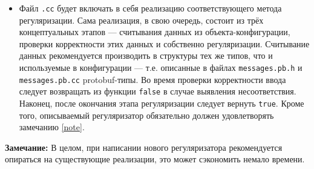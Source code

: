 \begin{itemize}
	\item Файл \verb'.cc' будет включать в себя реализацию соответствующего метода регуляризации. Сама реализация, в свою очередь, состоит из трёх концептуальных этапов --- считывания данных из объекта-конфигурации, проверки корректности этих данных и собственно регуляризации. Считывание данных рекомендуется производить в структуры тех же типов, что и используемые в конфигурации --- т.е. описанные в файлах \verb'messages.pb.h' и \verb'messages.pb.cc' protobuf-типы. Во время проверки корректности ввода следует возвращать из функции \verb'false' в случае выявления несоответствия. Наконец, после окончания этапа регуляризации следует вернуть \verb'true'. Кроме того, описываемый регуляризатор обязательно должен удовлетворять замечанию \ref{note}.
	
\end{itemize}

{\bf Замечание: } В целом, при написании нового регуляризатора рекомендуется опираться на существующие реализации, это может сэкономить немало времени.
